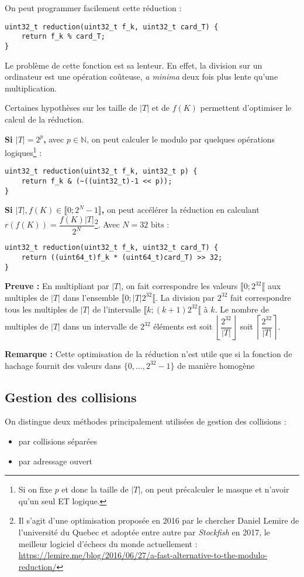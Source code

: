 \documentclass[../../../main.tex]{subfiles}
\begin{document}
On peut programmer facilement cette réduction :
\begin{verbatim}
uint32_t reduction(uint32_t f_k, uint32_t card_T) {
	return f_k % card_T;
}
\end{verbatim}
Le problème de cette fonction est sa lenteur. En effet, la division sur un ordinateur est une opération coûteuse, \textit{a minima} deux fois plus lente qu'une multiplication.

Certaines hypothèses sur les taille de $|T|$ et de $f(K)$ permettent d'optimiser le calcul de la réduction. 

\textbf{Si $|T| = 2^p$,} avec $p\in\mathbb{N}$, on peut calculer le modulo par quelques opérations logiques\footnote{Si on fixe $p$ et donc la taille de $|T|$, on peut précalculer le masque et n'avoir qu'un seul ET logique.} :
\begin{verbatim}
uint32_t reduction(uint32_t f_k, uint32_t p) {
	return f_k & (~((uint32_t)-1 << p));
}
\end{verbatim}

\textbf{Si $|T|, f(K)\in\llbracket 0; 2^N - 1\rrbracket$,} on peut accélérer la réduction en calculant $r(f(K)) = \dfrac{f(K)|T|}{2^N}$\footnote{Il s'agit d'une optimisation proposée en 2016 par le chercher Daniel Lemire de l'université du Quebec et adoptée entre autre par \textit{Stockfish} en 2017, le meilleur logiciel d'échecs du monde actuellement : \url{https://lemire.me/blog/2016/06/27/a-fast-alternative-to-the-modulo-reduction/}}. Avec $N = 32\text{ bits}$ :
\begin{verbatim}
uint32_t reduction(uint32_t f_k, uint32_t card_T) {
	return ((uint64_t)f_k * (uint64_t)card_T) >> 32;
}
\end{verbatim}
\textbf{Preuve :} En multipliant par $|T|$, on fait correspondre les valeurs $\llbracket 0; 2^{32}\llbracket$ aux multiples de $|T|$ dans l'ensemble $\llbracket 0; |T|2^{32}\llbracket$. La division par $2^{32}$ fait correspondre tous les multiples de $|T|$ de l'intervalle $\llbracket k; (k+1)2^{32}\llbracket$ à $k$. Le nombre de multiples de $|T|$ dans un intervalle de $2^{32}$ éléments est soit $\left\lfloor \dfrac{2^{32}}{|T|}\right\rfloor$ soit $\left\lceil \dfrac{2^{32}}{|T|}\right\rceil$.

\textbf{Remarque :} Cette optimisation de la réduction n'est utile que si la fonction de hachage fournit des valeurs dans $\{0, \dots, 2^{32}-1\}$ de manière homogène
\subsection{Gestion des collisions}
On distingue deux méthodes principalement utilisées de gestion des collisions :
\begin{itemize}
	\item par collisions séparées
	\item par adressage ouvert
\end{itemize}
\end{document}
